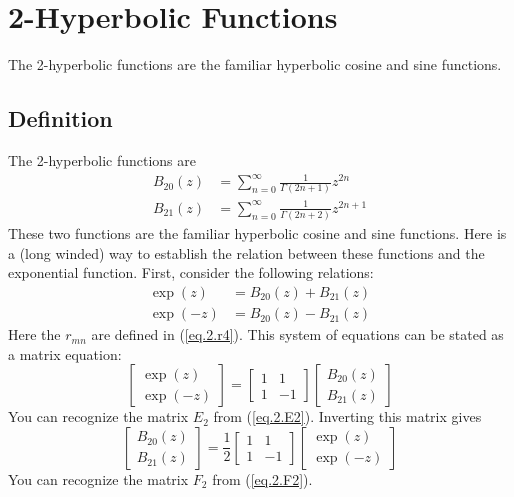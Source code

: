 \chapter{2-Hyperbolic Functions}
The 2-hyperbolic functions are the familiar hyperbolic cosine and sine functions.
\section{Definition}
The 2-hyperbolic functions are
\begin{align}
    B_{20}(z) &= \sum_{n = 0}^{\infty} \frac{1}{\Gamma\left(2n+1\right)} z^{2n} \\
    B_{21}(z) &= \sum_{n = 0}^{\infty} \frac{1}{\Gamma\left(2n+2\right)} z^{2n+1}
\end{align}
These two functions are the familiar hyperbolic cosine and sine functions. Here is a (long winded) way to establish the relation between these functions and the exponential function. First, consider the following relations:
\begin{align}
    \exp\left( z \right) &= B_{20}(z) + B_{21}(z) \\
    \exp\left( -z \right) &= B_{20}(z) - B_{21}(z)
\end{align}
Here the $r_{mn}$ are defined in (\ref{eq.2.r4}). This system of equations can be stated as a matrix equation:
\begin{equation}
    \begin{bmatrix}
        \exp\left( z \right) \\ \exp\left( -z \right)
    \end{bmatrix} = 
    \begin{bmatrix}
        1 & 1 \\ 1 & -1
    \end{bmatrix}
    \begin{bmatrix}
        B_{20}(z) \\ B_{21}(z)
    \end{bmatrix}
\end{equation}
You can recognize the matrix $E_{2}$ from (\ref{eq.2.E2}). Inverting this matrix gives
\begin{equation}
    \begin{bmatrix}
        B_{20}(z) \\ B_{21}(z)
    \end{bmatrix} = \frac{1}{2}
    \begin{bmatrix}
        1 & 1 \\ 1 & -1
    \end{bmatrix}
    \begin{bmatrix}
        \exp\left( z \right) \\ \exp\left( -z \right)
    \end{bmatrix}
\end{equation}
You can recognize the matrix $F_{2}$ from (\ref{eq.2.F2}).

